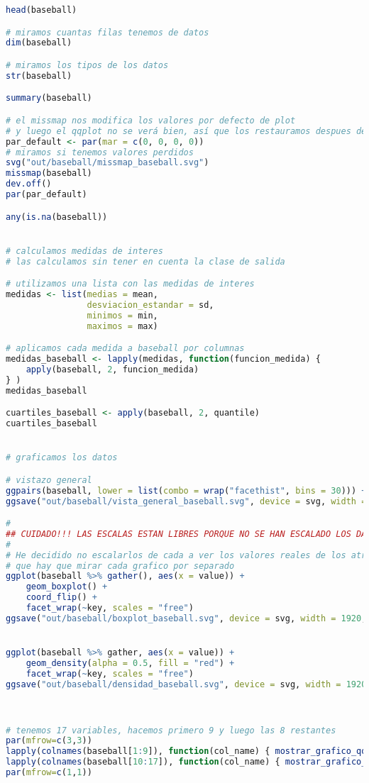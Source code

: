 \begin{lstlisting}[language=R]
head(baseball)

# miramos cuantas filas tenemos de datos
dim(baseball)

# miramos los tipos de los datos
str(baseball)

summary(baseball)

# el missmap nos modifica los valores por defecto de plot
# y luego el qqplot no se verá bien, así que los restauramos despues del missmap
par_default <- par(mar = c(0, 0, 0, 0))
# miramos si tenemos valores perdidos
svg("out/baseball/missmap_baseball.svg")
missmap(baseball)
dev.off()
par(par_default)

any(is.na(baseball))


# calculamos medidas de interes
# las calculamos sin tener en cuenta la clase de salida

# utilizamos una lista con las medidas de interes
medidas <- list(medias = mean,
				desviacion_estandar = sd,
				minimos = min,
				maximos = max)

# aplicamos cada medida a baseball por columnas
medidas_baseball <- lapply(medidas, function(funcion_medida) {
	apply(baseball, 2, funcion_medida)
} )
medidas_baseball

cuartiles_baseball <- apply(baseball, 2, quantile)
cuartiles_baseball


# graficamos los datos

# vistazo general
ggpairs(baseball, lower = list(combo = wrap("facethist", bins = 30))) + theme_minimal()
ggsave("out/baseball/vista_general_baseball.svg", device = svg, width = 1920, height = 1080, units = "px", dpi = 100)

#
## CUIDADO!!! LAS ESCALAS ESTAN LIBRES PORQUE NO SE HAN ESCALADO LOS DATOS
#
# He decidido no escalarlos de cada a ver los valores reales de los atributos, así
# que hay que mirar cada grafico por separado
ggplot(baseball %>% gather(), aes(x = value)) +
	geom_boxplot() +
	coord_flip() +
	facet_wrap(~key, scales = "free")
ggsave("out/baseball/boxplot_baseball.svg", device = svg, width = 1920, height = 1080, units = "px", dpi = 150)


ggplot(baseball %>% gather, aes(x = value)) +
	geom_density(alpha = 0.5, fill = "red") +
	facet_wrap(~key, scales = "free")
ggsave("out/baseball/densidad_baseball.svg", device = svg, width = 1920, height = 1080, units = "px", dpi = 150)



# tenemos 17 variables, hacemos primero 9 y luego las 8 restantes
par(mfrow=c(3,3))
lapply(colnames(baseball[1:9]), function(col_name) { mostrar_grafico_qq(baseball[,col_name], col_name, save_plot = TRUE, directorio = "baseball") } )
lapply(colnames(baseball[10:17]), function(col_name) { mostrar_grafico_qq(baseball[,col_name], col_name, save_plot = TRUE, directorio = "baseball") } )
par(mfrow=c(1,1))



\end{lstlisting}
